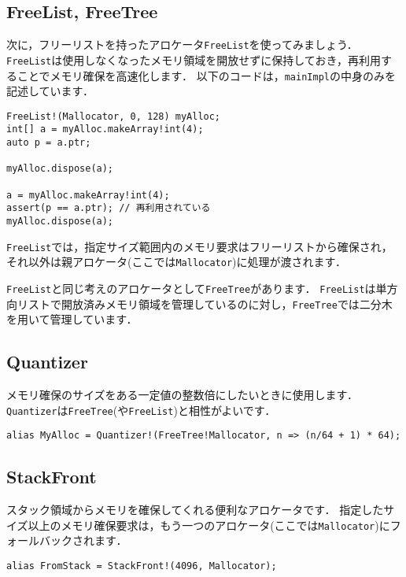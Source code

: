 \subsection{FreeList, FreeTree}

次に，フリーリストを持ったアロケータ\texttt{FreeList}を使ってみましょう．
\texttt{FreeList}は使用しなくなったメモリ領域を開放せずに保持しておき，再利用することでメモリ確保を高速化します．
以下のコードは，\texttt{mainImpl}の中身のみを記述しています．

\begin{lstlisting}
FreeList!(Mallocator, 0, 128) myAlloc;
int[] a = myAlloc.makeArray!int(4);
auto p = a.ptr;

myAlloc.dispose(a);

a = myAlloc.makeArray!int(4);
assert(p == a.ptr); // 再利用されている
myAlloc.dispose(a);
\end{lstlisting}

\texttt{FreeList}では，指定サイズ範囲内のメモリ要求はフリーリストから確保され，それ以外は親アロケータ(ここでは\texttt{Mallocator})に処理が渡されます．

\texttt{FreeList}と同じ考えのアロケータとして\texttt{FreeTree}があります．
\texttt{FreeList}は単方向リストで開放済みメモリ領域を管理しているのに対し，\texttt{FreeTree}では二分木を用いて管理しています．

\subsection{Quantizer}

メモリ確保のサイズをある一定値の整数倍にしたいときに使用します．
\texttt{Quantizer}は\texttt{FreeTree}(や\texttt{FreeList})と相性がよいです．

\begin{lstlisting}
alias MyAlloc = Quantizer!(FreeTree!Mallocator, n => (n/64 + 1) * 64);
\end{lstlisting}

\subsection{StackFront}

スタック領域からメモリを確保してくれる便利なアロケータです．
指定したサイズ以上のメモリ確保要求は，もう一つのアロケータ(ここでは\texttt{Mallocator})にフォールバックされます．

\begin{lstlisting}
alias FromStack = StackFront!(4096, Mallocator);
\end{lstlisting}

